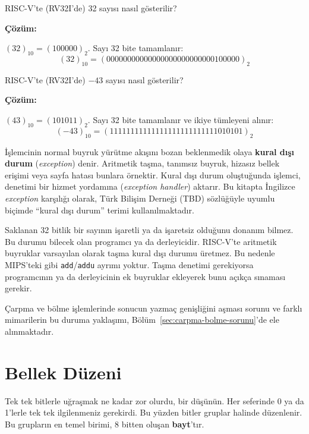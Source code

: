 \begin{ornek}[3.6]
RISC-V'te (RV32I'de) 32 sayısı nasıl gösterilir?

\textbf{Çözüm:}

$(32)_{10} = (100000)_2$. Sayı 32 bite tamamlanır:
\[
(32)_{10} = (00000000000000000000000000100000)_2
\]
\end{ornek}

\begin{ornek}[3.7]
RISC-V'te (RV32I'de) $-43$ sayısı nasıl gösterilir?

\textbf{Çözüm:}

$(43)_{10} = (101011)_2$. Sayı 32 bite tamamlanır ve ikiye tümleyeni alınır:
\[
(-43)_{10} = (11111111111111111111111111010101)_2
\]
\end{ornek}

\begin{tanim}
İşlemcinin normal buyruk yürütme akışını bozan beklenmedik olaya \textbf{kural dışı durum} (\emph{exception}) denir. Aritmetik taşma, tanımsız buyruk, hizasız bellek erişimi veya sayfa hatası bunlara örnektir. Kural dışı durum oluştuğunda işlemci, denetimi bir hizmet yordamına (\emph{exception handler}) aktarır. Bu kitapta İngilizce \emph{exception} karşılığı olarak, Türk Bilişim Derneği (TBD) sözlüğüyle uyumlu biçimde ``kural dışı durum'' terimi kullanılmaktadır.
\end{tanim}

Saklanan 32 bitlik bir sayının işaretli ya da işaretsiz olduğunu donanım bilmez. Bu durumu bilecek olan programcı ya da derleyicidir. RISC-V'te aritmetik buyruklar varsayılan olarak taşma kural dışı durumu üretmez. Bu nedenle MIPS'teki gibi \texttt{add}/\texttt{addu} ayrımı yoktur. Taşma denetimi gerekiyorsa programcının ya da derleyicinin ek buyruklar ekleyerek bunu açıkça sınaması gerekir.

Çarpma ve bölme işlemlerinde sonucun yazmaç genişliğini aşması sorunu ve farklı mimarilerin bu duruma yaklaşımı, Bölüm~\ref{sec:carpma-bolme-sorunu}'de ele alınmaktadır.


\section{Bellek Düzeni}
\label{sec:bellek-duzeni}

Tek tek bitlerle uğraşmak ne kadar zor olurdu, bir düşünün. Her seferinde 0 ya da 1'lerle tek tek ilgilenmeniz gerekirdi. Bu yüzden bitler gruplar halinde düzenlenir. Bu grupların en temel birimi, 8 bitten oluşan \textbf{bayt}'tır.

